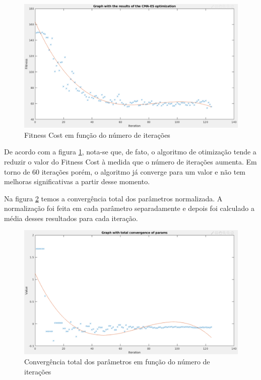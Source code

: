 \documentclass[a4paper,12pt]{article}
\begin{document}
\begin{figure}[H]
	\centering
	\includegraphics[width=1.0\textwidth]{figures/CMA-ES_Fitness_Results.png}
	\caption{Fitness Cost em função do número de iterações}
	\label{fig:fitness_trajetoria_basica}
\end{figure}

De acordo com a figura \ref{fig:fitness_trajetoria_basica}, nota-se que, de fato, o algoritmo de otimização tende a reduzir o valor do Fitness Cost à medida que o número de iterações aumenta. Em torno de 60 iterações porém, o algoritmo já converge para um valor e não tem melhoras significativas a partir desse momento.

Na figura \ref{fig:convergencia_total_trajetoria_basica} temos a convergência total dos parâmetros normalizada. A normalização foi feita em cada parâmetro separadamente e depois foi calculado a média desses resultados para cada iteração.

\begin{figure}[H]
	\centering
	\includegraphics[width=1.0\textwidth]{figures/CMA-ES_Total_parameter_convergence.png}
	\caption{Convergência total dos parâmetros em função do número de iterações}
	\label{fig:convergencia_total_trajetoria_basica}
\end{figure}
\end{document}
